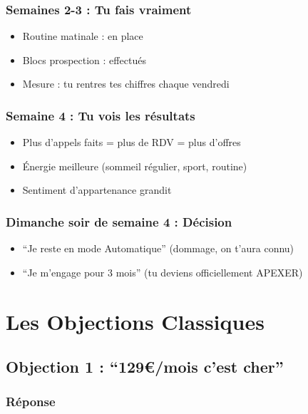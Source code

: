 \documentclass[12pt,a4paper,openany]{book}
\begin{document}
\subsection{Semaines 2-3 : Tu fais vraiment}

\begin{itemize}
\item Routine matinale : en place
\item Blocs prospection : effectués
\item Mesure : tu rentres tes chiffres chaque vendredi
\end{itemize}

\subsection{Semaine 4 : Tu vois les résultats}

\begin{itemize}
\item Plus d'appels faits = plus de RDV = plus d'offres
\item Énergie meilleure (sommeil régulier, sport, routine)
\item Sentiment d'appartenance grandit
\end{itemize}

\subsection{Dimanche soir de semaine 4 : Décision}

\begin{itemize}
\item ``Je reste en mode Automatique'' (dommage, on t'aura connu)
\item ``Je m'engage pour 3 mois'' (tu deviens officiellement APEXER)
\end{itemize}

\clearpage

\chapter{Les Objections Classiques}

\section{Objection 1 : ``129\euro{}/mois c'est cher''}

\subsection{Réponse}
\end{document}

